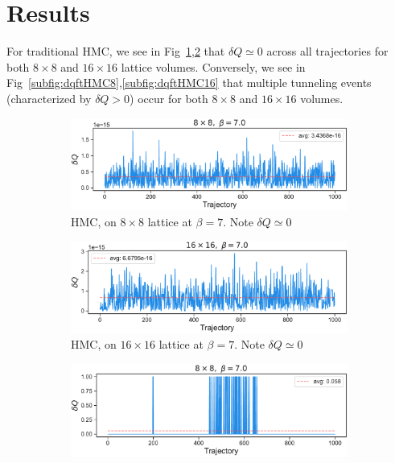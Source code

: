 \documentclass[a4paper,11pt]{article}
\begin{document}
\section{\label{sec:results}Results}
%
For traditional HMC, we see in Fig~\ref{subfig:dqHMC8},\ref{subfig:dqHMC16}
that \(\delta Q \simeq 0\) across all trajectories for both \(8\times 8\) and
\(16\times 16\) lattice volumes.
%
Conversely, we see in Fig~\ref{subfig:dqftHMC8},\ref{subfig:dqftHMC16} that
multiple tunneling events (characterized by \(\delta Q > 0\)) occur for both
\(8 \times 8\) and \(16 \times 16\) volumes.
%
\begin{figure}[htpb]
    \centering
    \begin{subfigure}[b]{0.49\textwidth}
        \includegraphics[width=\textwidth]{assets/dqHMC_8x8_beta7.pdf}
        \caption{\label{subfig:dqHMC8}HMC, on \(8 \times 8\) lattice at
            \(\beta = 7\). Note \(\delta Q \simeq 0\)}
    \end{subfigure}
    \hfill
    \begin{subfigure}[b]{0.49\textwidth}
        \includegraphics[width=\textwidth]{assets/dqHMC_16x16_beta7.pdf}
        \caption{\label{subfig:dqHMC16}HMC, on \(16 \times 16\) lattice at
        \(\beta = 7\). Note \(\delta Q \simeq 0\)}
    \end{subfigure}
    \begin{subfigure}[b]{0.49\textwidth}
        \includegraphics[width=\textwidth]{assets/dqftHMC_8x8_beta7.pdf}

\end{subfigure}
\end{figure}
\end{document}
